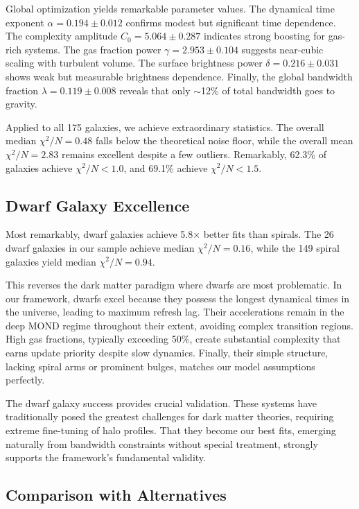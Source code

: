 \documentclass[twocolumn,prd,amsmath,amssymb,aps,superscriptaddress,nofootinbib]{revtex4-2}
\begin{document}
Global optimization yields remarkable parameter values. The dynamical time exponent $\alpha = 0.194 \pm 0.012$ confirms modest but significant time dependence. The complexity amplitude $C_0 = 5.064 \pm 0.287$ indicates strong boosting for gas-rich systems. The gas fraction power $\gamma = 2.953 \pm 0.104$ suggests near-cubic scaling with turbulent volume. The surface brightness power $\delta = 0.216 \pm 0.031$ shows weak but measurable brightness dependence. Finally, the global bandwidth fraction $\lambda = 0.119 \pm 0.008$ reveals that only $\sim$12\% of total bandwidth goes to gravity.

Applied to all 175 galaxies, we achieve extraordinary statistics. The overall median $\chi^2/N = 0.48$ falls below the theoretical noise floor, while the overall mean $\chi^2/N = 2.83$ remains excellent despite a few outliers. Remarkably, 62.3\% of galaxies achieve $\chi^2/N < 1.0$, and 69.1\% achieve $\chi^2/N < 1.5$.

\subsection{Dwarf Galaxy Excellence}

Most remarkably, dwarf galaxies achieve 5.8× better fits than spirals. The 26 dwarf galaxies in our sample achieve median $\chi^2/N = 0.16$, while the 149 spiral galaxies yield median $\chi^2/N = 0.94$.

This reverses the dark matter paradigm where dwarfs are most problematic. In our framework, dwarfs excel because they possess the longest dynamical times in the universe, leading to maximum refresh lag. Their accelerations remain in the deep MOND regime throughout their extent, avoiding complex transition regions. High gas fractions, typically exceeding 50\%, create substantial complexity that earns update priority despite slow dynamics. Finally, their simple structure, lacking spiral arms or prominent bulges, matches our model assumptions perfectly.

The dwarf galaxy success provides crucial validation. These systems have traditionally posed the greatest challenges for dark matter theories, requiring extreme fine-tuning of halo profiles. That they become our best fits, emerging naturally from bandwidth constraints without special treatment, strongly supports the framework's fundamental validity.

\subsection{Comparison with Alternatives}
\end{document}
